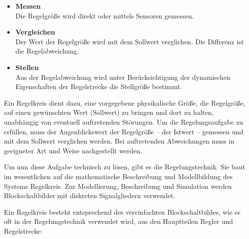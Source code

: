 \begin{itemize}
	\item \textbf{Messen}
	\\[1mm] Die Regelgröße wird direkt oder mittels Sensoren gemessen.
	\medskip
	\item \textbf{Vergleichen}
	\\[1mm] Der Wert der Regelgröße wird mit dem Sollwert verglichen. Die Differenz ist die Regelabweichung.
	\medskip
	\item \textbf{Stellen}
	\\[1mm] Aus der Regelabweichung wird unter Berücksichtigung der dynamischen Eigenschaften der Regelstrecke die Stellgröße bestimmt.
\end{itemize}
\vspace{3mm}

Ein Regelkreis dient dazu, eine vorgegebene physikalische Größe, die Regelgröße, auf einen gewünschten Wert (Sollwert) zu bringen und dort zu halten, unabhängig von eventuell auftretenden Störungen. Um die Regelungsaufgabe zu erfüllen, muss der Augenblickswert der Regelgröße – der Istwert – gemessen und mit dem Sollwert verglichen werden. Bei auftretenden Abweichungen muss in geeigneter Art und Weise nachgestellt werden.

Um nun diese Aufgabe technisch zu lösen, gibt es die Regelungstechnik. Sie baut im wesentlichen auf die mathematische Beschreibung und Modellbildung des Systems Regelkreis. Zur Modellierung, Beschreibung und Simulation werden Blockschaltbilder mit diskreten Signalgliedern verwendet.

\newpage

Ein Regelkreis besteht entsprechend des vereinfachten Blockschaltbildes, wie es oft in der Regelungstechnik verwendet wird, aus den Hauptteilen Regler und Regelstrecke:
\\[5mm]

